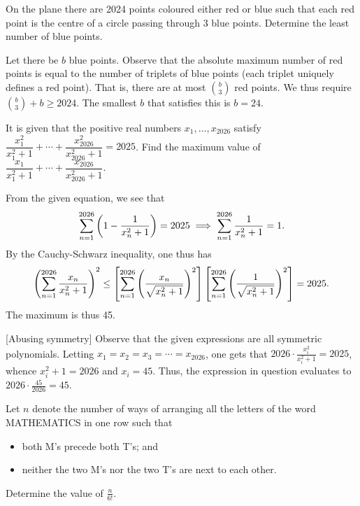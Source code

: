\begin{question}[24]\label{A::2024-O-1-22}
    On the plane there are 2024 points coloured either red or blue such that each red point is the centre of a circle passing through 3 blue points. Determine the least number of blue points.
\end{question}

Let there be $b$ blue points. Observe that the absolute maximum number of red points is equal to the number of triplets of blue points (each triplet uniquely defines a red point). That is, there are at most $\binom{b}{3}$ red points. We thus require $\binom{b}{3} + b \geq 2024$. The smallest $b$ that satisfies this is $b = 24$.

\begin{question}[45]\label{A::2024-O-1-23}
    It is given that the positive real numbers $x_1, \ldots, x_{2026}$ satisfy $\dfrac{x_1^2}{x_1^2 + 1} + \cdots + \dfrac{x_{2026}^2}{x_{2026}^2 + 1} = 2025$. Find the maximum value of $\dfrac{x_1}{x_1^2 + 1} + \cdots + \dfrac{x_{2026}}{x_{2026}^2 + 1}$.
\end{question}

 From the given equation, we see that \[\sum_{n=1}^{2026} \left( 1 - \frac1{x_n^2 +1} \right) = 2025 \implies \sum_{n=1}^{2026} \frac1{x_n^2 + 1} = 1.\] By the Cauchy-Schwarz inequality, one thus has \[\left( \sum_{n=1}^{2026} \frac{x_n}{x_n^2 + 1} \right)^2 \leq \left[ \sum_{n=1}^{2026} \left( \frac{x_n}{\sqrt{x_n^2 + 1}} \right)^2 \right] \left[ \sum_{n=1}^{2026} \left( \frac{1}{\sqrt{x_n^2 + 1}} \right)^2 \right] = 2025.\] The maximum is thus 45.

[Abusing symmetry] Observe that the given expressions are all symmetric polynomials. Letting $x_1 = x_2 = x_3 = \cdots = x_{2026}$, one gets that $2026 \cdot \frac{x_i^2}{x_i^2 + 1} = 2025$, whence $x_i^2 + 1 = 2026$ and $x_i = 45$. Thus, the expression in question evaluates to $2026 \cdot \frac{45}{2026} = 45$. 

\begin{question}[441]\label{A::2024-O-1-24}
    Let $n$ denote the number of ways of arranging all the letters of the word MATHEMATICS in one row such that
    \begin{itemize}
        \item both M's precede both T's; and
        \item neither the two M's nor the two T's are next to each other.
    \end{itemize}
    Determine the value of $\frac{n}{6!}$.
\end{question}

